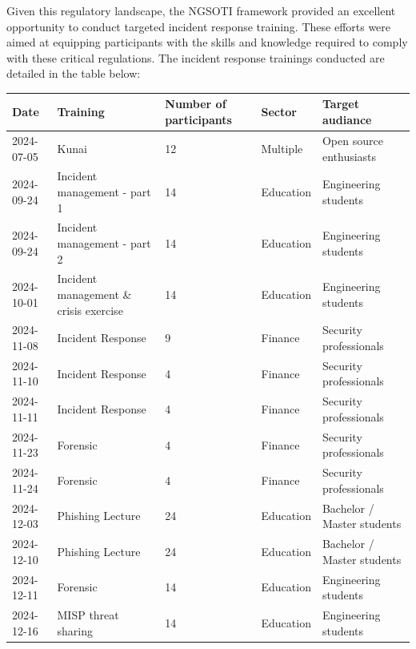 Given this regulatory landscape, the NGSOTI framework provided an excellent opportunity to conduct targeted incident response training. These efforts were aimed at equipping participants with the skills and knowledge required to comply with these critical regulations. The incident response trainings conducted are detailed in the table below:


\begin{table}
	\begin{tabular}{llp{2cm}ll}
		\hline
		Date       & Training            & Number of participants & Sector    & Target audiance         \\
		\hline
		2024-07-05 & Kunai               & 12                     & Multiple  & Open source enthusiasts \\
        2024-09-24 & Incident management - part 1  &14            & Education & Engineering students\\
        2024-09-24 & Incident management  - part 2 & 14           & Education & Engineering students \\
        2024-10-01 & Incident management \& crisis  exercise & 14 & Education & Engineering students\\
		2024-11-08 & Incident Response   & 9                      & Finance   & Security professionals  \\
		2024-11-10 & Incident Response   & 4                      & Finance   & Security professionals  \\
		2024-11-11 & Incident Response   & 4                      & Finance   & Security professionals  \\
		2024-11-23 & Forensic            & 4                      & Finance   & Security professionals  \\
		2024-11-24 & Forensic            & 4                      & Finance   & Security professionals  \\
        	2024-12-03 & Phishing Lecture    & 24 			  & Education & Bachelor / Master students  \\
        	2024-12-10 & Phishing Lecture    & 24 			  & Education & Bachelor / Master students  \\
		2024-12-11 & Forensic            & 14                     & Education & Engineering students    \\
		2024-12-16 & MISP threat sharing & 14                     & Education & Engineering students    \\
		\hline
	\end{tabular}
\end{table}

